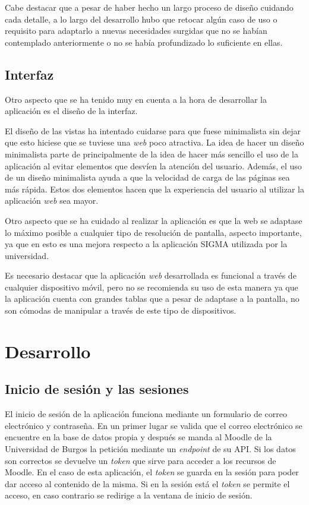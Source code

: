 Cabe destacar que a pesar de haber hecho un largo proceso de diseño cuidando cada detalle, a lo largo del desarrollo hubo que retocar algún caso de uso o requisito para adaptarlo a nuevas necesidades surgidas que no se habían contemplado anteriormente o no se había profundizado lo suficiente en ellas.

\subsection{Interfaz}
Otro aspecto que se ha tenido muy en cuenta a la hora de desarrollar la aplicación es el diseño de la interfaz.

El diseño de las vistas ha intentado cuidarse para que fuese minimalista sin dejar que esto hiciese que se tuviese una \textit{web} poco atractiva.
La idea de hacer un diseño minimalista parte de principalmente de la idea de hacer más sencillo el uso de la aplicación al evitar elementos que desvíen la atención del usuario.
Además, el uso de un diseño minimalista ayuda a que la velocidad de carga de las páginas sea más rápida.
Estos dos elementos hacen que la experiencia del usuario al utilizar la aplicación \textit{web} sea mayor.

Otro aspecto que se ha cuidado al realizar la aplicación es que la web se adaptase lo máximo posible a cualquier tipo de resolución de pantalla, aspecto importante, ya que en esto es una mejora respecto a la aplicación SIGMA utilizada por la universidad.

Es necesario destacar que la aplicación \textit{web} desarrollada es funcional a través de cualquier dispositivo móvil, pero no se recomienda su uso de esta manera ya que la aplicación cuenta con grandes tablas que a pesar de adaptase a la pantalla, no son cómodas de manipular a través de este tipo de dispositivos.

\section{Desarrollo}
\subsection{Inicio de sesión y las sesiones}
El inicio de sesión de la aplicación funciona mediante un formulario de correo electrónico y contraseña.
En un primer lugar se valida que el correo electrónico se encuentre en la base de datos propia y después se manda al Moodle de la Universidad de Burgos la petición mediante un \textit{endpoint} de su API. 
Si los datos son correctos se devuelve un \textit{token} que sirve para acceder a los recursos de Moodle.
En el caso de esta aplicación, el \textit{token} se guarda en la sesión para poder dar acceso al contenido de la misma.
Si en la sesión está el \textit{token} se permite el acceso, en caso contrario se redirige a la ventana de inicio de sesión.

